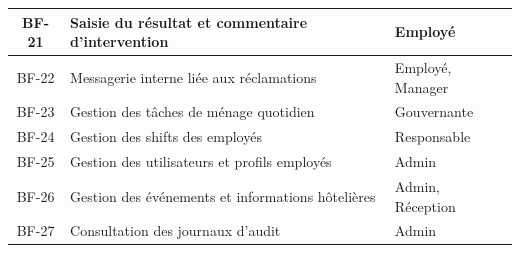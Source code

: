 \begin{table}[H]
\begin{tabularx}{\textwidth}{|c|X|p{3cm}|}
BF-21 & Saisie du résultat et commentaire d'intervention & Employé \\ \hline
BF-22 & Messagerie interne liée aux réclamations & Employé, Manager \\ \hline
BF-23 & Gestion des tâches de ménage quotidien & Gouvernante \\ \hline
BF-24 & Gestion des shifts des employés & Responsable \\ \hline
BF-25 & Gestion des utilisateurs et profils employés & Admin \\ \hline
BF-26 & Gestion des événements et informations hôtelières & Admin, Réception \\ \hline
BF-27 & Consultation des journaux d'audit & Admin \\ \hline
\end{tabularx}
\label{tab:besoins_fonctionnels}
\end{table}
\FloatBarrier
